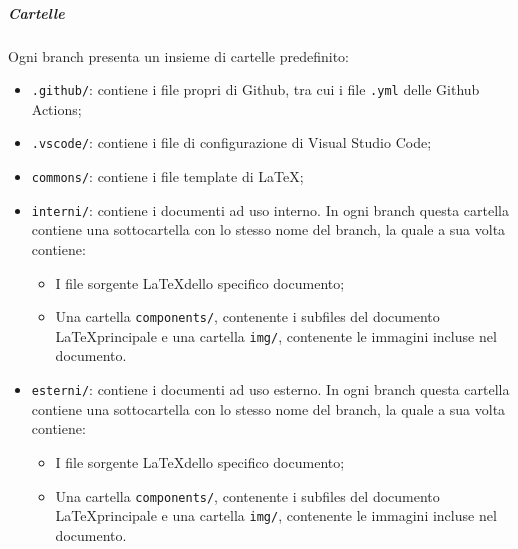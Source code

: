 \documentclass[../norme-di-progetto.tex]{subfiles}
\begin{document}
\subparagraph*{Cartelle}
Ogni branch presenta un insieme di cartelle predefinito:
\begin{itemize}
\item \texttt{.github/}: contiene i file propri di Github, tra cui i file \texttt{.yml} delle Github Actions;
  \item \texttt{.vscode/}: contiene i file di configurazione di Visual Studio Code;
  \item \texttt{commons/}: contiene i file template di \LaTeX;
  \item \texttt{interni/}: contiene i documenti ad uso interno. In ogni branch questa cartella contiene una sottocartella con lo stesso nome del branch, la quale a sua volta contiene:
  \begin{itemize}
  \item I file sorgente \LaTeX dello specifico documento;
  \item Una cartella \texttt{components/}, contenente i subfiles del documento \LaTeX principale e una cartella \texttt{img/}, contenente le immagini incluse nel documento.
  \end{itemize}
  \item \texttt{esterni/}: contiene i documenti ad uso esterno. In ogni branch questa cartella contiene una sottocartella con lo stesso nome del branch, la quale a sua volta contiene:
  \begin{itemize}
  \item I file sorgente \LaTeX dello specifico documento;
  \item Una cartella \texttt{components/}, contenente i subfiles del documento \LaTeX principale e una cartella \texttt{img/}, contenente le immagini incluse nel documento.
  \end{itemize}
\end{itemize}
\end{document}
